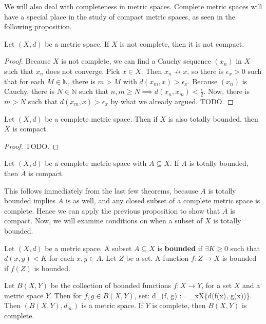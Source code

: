 	We will also deal with completeness in metric spaces. Complete metric spaces will have a special place in the study of 
	compact metric spaces, as seen in the following proposition.
	
	\begin{prop}
		Let $(X, d)$ be a metric space. If $X$ is not complete, then it is not compact.
	\end{prop}
	
	\begin{proof}
		Because $X$ is not complete, we can find a Cauchy sequence $(x_n)$ in $X$ such that $x_n$ does not converge. 
		Pick $x\in X$. Then $x_n\not\rightarrow x$, so there is $\epsilon_x > 0$ such that for each $M\in\mathbb N$, 
		there is $m > M$ with $d(x_m, x) > \epsilon_x$. Because $(x_n)$ is Cauchy, there is $N\in\mathbb N$ such 
		that $n, m\geq N\implies d(x_n, x_m) < \frac{\epsilon}{2}$. Now, there is $m > N$ such that $d(x_m, x) > 
		\epsilon_x$ by what we already argued. TODO.
	\end{proof}
	
	\begin{prop}
		Let $(X, d)$ be a complete metric space. Then if $X$ is also totally bounded, then $X$ is compact.
	\end{prop}
	
	\begin{proof}
		TODO.
	\end{proof}
	
	\begin{theorem}
		Let $(X, d)$ be a complete metric space with $A\subseteq X$. If $A$ is totally bounded, then $\overline A$ is 
		compact.
	\end{theorem}
	
	This follows immediately from the last few theorems, because $A$ is totally bounded implies $\overline A$ is as well, 
	and any closed subset of a complete metric space is complete. Hence we can apply the previous proposition to show 
	that $\overline A$ is compact. Now, we will examine conditions on when a subset of $X$ is totally bounded.
	
	\begin{definition}[Bounded]
		Let $(X, d)$ be a metric space. A subset $A\subseteq X$ is \textbf{bounded} if $\exists K\geq 0$ such 
		that $d(x, y) < K$ for each $x, y\in A$. Let $Z$ be a set. A function $f : Z\rightarrow X$ is bounded if 
		$f(Z)$ is bounded.
	\end{definition}
	
	\begin{theorem}
		Let $B(X, Y)$ be the collection of bounded functions $f : X\rightarrow Y$, for a set $X$ and a 
		metric space $Y$. Then for $f, g\in B(X, Y)$, set:
		\eq
			d_\infty (f, g) := \sup_{x\in X}\{d(f(x), g(x))\}.
		\qe
		Then $(B(X, Y), d_\infty)$ is a metric space. If $Y$ is complete, then $B(X, Y)$ is complete.
	\end{theorem}
	
